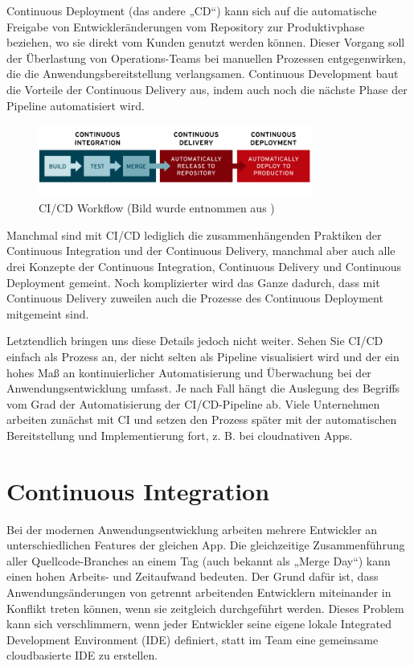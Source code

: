 Continuous Deployment (das andere „CD“) kann sich auf die automatische Freigabe von Entwickleränderungen vom Repository zur Produktivphase beziehen, wo sie direkt vom Kunden genutzt werden können. Dieser Vorgang soll der Überlastung von Operations-Teams bei manuellen Prozessen entgegenwirken, die die Anwendungsbereitstellung verlangsamen. Continuous Development baut die Vorteile der Continuous Delivery aus, indem auch noch die nächste Phase der Pipeline automatisiert wird.\autocite{whatIsCICD}

\begin{figure}[h]
	\centerline{
		\includegraphics[width=0.8\textwidth]{./grafiken/ci-cd-flow-redhatsource.png}
	}
	\vskip0pt
	\caption{CI/CD Workflow (Bild wurde entnommen aus \cite{whatIsCICD})}
\end{figure}


Manchmal sind mit CI/CD lediglich die zusammenhängenden Praktiken der Continuous Integration und der Continuous Delivery, manchmal aber auch alle drei Konzepte der Continuous Integration, Continuous Delivery und Continuous Deployment gemeint. Noch komplizierter wird das Ganze dadurch, dass mit Continuous Delivery zuweilen auch die Prozesse des Continuous Deployment mitgemeint sind.\autocite{whatIsCICD}

Letztendlich bringen uns diese Details jedoch nicht weiter. Sehen Sie CI/CD einfach als Prozess an, der nicht selten als Pipeline visualisiert wird und der ein hohes Maß an kontinuierlicher Automatisierung und Überwachung bei der Anwendungsentwicklung umfasst. Je nach Fall hängt die Auslegung des Begriffs vom Grad der Automatisierung der CI/CD-Pipeline ab. Viele Unternehmen arbeiten zunächst mit CI und setzen den Prozess später mit der automatischen Bereitstellung und Implementierung fort, z. B. bei cloudnativen Apps.\autocite{whatIsCICD}

\section{Continuous Integration}

Bei der modernen Anwendungsentwicklung arbeiten mehrere Entwickler an unterschiedlichen Features der gleichen App. Die gleichzeitige Zusammenführung aller Quellcode-Branches an einem Tag (auch bekannt als „Merge Day“) kann einen hohen Arbeits- und Zeitaufwand bedeuten. Der Grund dafür ist, dass Anwendungsänderungen von getrennt arbeitenden Entwicklern miteinander in Konflikt treten können, wenn sie zeitgleich durchgeführt werden. Dieses Problem kann sich verschlimmern, wenn jeder Entwickler seine eigene lokale Integrated Development Environment (IDE) definiert, statt im Team eine gemeinsame cloudbasierte IDE zu erstellen.\autocite{whatIsCICD}

